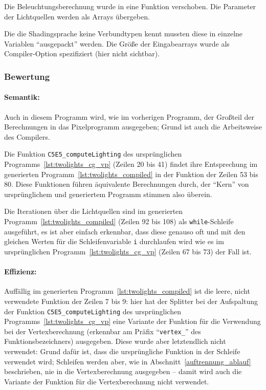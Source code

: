 \documentclass[twoside,a4paper,fleqn,12pt]{book}
\begin{document}
Die Beleuchtungsberechnung wurde in eine Funktion verschoben. Die Parameter der Lichtquellen werden als
Arrays übergeben.

{}

Die die Shadingsprache keine Verbundtypen kennt mussten diese in einzelne Variablen "`ausgepackt"' werden.
Die Größe der Eingabearrays wurde als Compiler-Option spezifiziert (hier nicht sichtbar).

{}

\subsubsection*{Bewertung}
\paragraph{Semantik:}
Auch in diesem Programm wird, wie im vorherigen Programm, der Großteil der Berechnungen in das Pixelprogramm ausgegeben;
Grund ist auch die Arbeitsweise des Compilers.

Die Funktion \verb+C5E5_computeLighting+ des ursprünglichen Programms~\ref{lst:twolights_cg_vp} (Zeilen 20 bis 41)
findet ihre Entsprechung im generierten Programm~\ref{lst:twolights_compiled} in der Funktion der Zeilen 53 bis 80.
Diese Funktionen führen äquivalente Berechnungen durch, der "`Kern"' von ursprünglichem und generiertem Programm
stimmen also überein. 

Die Iterationen über die Lichtquellen sind im generierten Programm~\ref{lst:twolights_compiled} (Zeilen 92 bis 108)
als \verb+while+-Schleife ausgeführt, es ist aber einfach erkennbar, dass diese genauso oft und mit den gleichen
Werten für die Schleifenvariable \verb+i+ durchlaufen wird wie es im ursprünglichen Programm~\ref{lst:twolights_cg_vp} (Zeilen 67 bis 73)
der Fall ist.

\paragraph{Effizienz:}
Auffällig im generierten Programm~\ref{lst:twolights_compiled} ist die leere, nicht verwendete Funktion der Zeilen 7 bis 9:
hier hat der Splitter bei der Aufspaltung der Funktion \verb+C5E5_computeLighting+ des ursprünglichen Programms~\ref{lst:twolights_cg_vp}
eine Variante der Funktion für die Verwendung bei der Vertexberechnung (erkennbar am Präfix "`\verb+vertex_+"' des Funktionsbezeichners) ausgegeben.
Diese wurde aber letztendlich nicht verwendet: Grund dafür ist, dass die ursprüngliche Funktion in der Schleife verwendet wird;
Schleifen werden aber, wie in Abschnitt~\ref{auftrennung_ablauf} beschrieben, nie in die Vertexberechnung ausgegeben --
damit wird auch die Variante der Funktion für die Vertexberechnung nicht verwendet.
\end{document}
